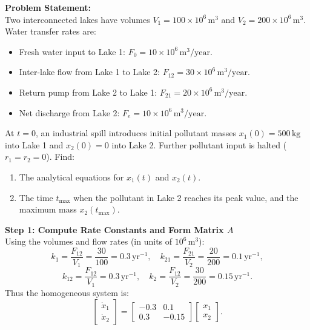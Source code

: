 \documentclass[12pt]{article}
\begin{document}
\begin{examplebox*}
\textbf{Problem Statement:}\\
Two interconnected lakes have volumes $V_1 = 100 \times 10^6\,\text{m}^3$ and $V_2 = 200 \times 10^6\,\text{m}^3$. 
Water transfer rates are:
\begin{itemize}[itemsep=1pt]
  \item Fresh water input to Lake 1: $F_0 = 10 \times 10^6\,\text{m}^3/\text{year}$.
  \item Inter-lake flow from Lake 1 to Lake 2: $F_{12} = 30 \times 10^6\,\text{m}^3/\text{year}$.
  \item Return pump from Lake 2 to Lake 1: $F_{21} = 20 \times 10^6\,\text{m}^3/\text{year}$.
  \item Net discharge from Lake 2: $F_e = 10 \times 10^6\,\text{m}^3/\text{year}$.
\end{itemize}
At $t = 0$, an industrial spill introduces initial pollutant masses $x_1(0) = 500\,\text{kg}$ into Lake 1 and $x_2(0) = 0$ into Lake 2. Further pollutant input is halted ($r_1 = r_2 = 0$).
Find:
\begin{enumerate}[label=(\alph*), itemsep=1pt]
  \item The analytical equations for $x_1(t)$ and $x_2(t)$.
  \item The time $t_{\max}$ when the pollutant in Lake 2 reaches its peak value, and the maximum mass $x_2(t_{\max})$.
\end{enumerate}

\vspace{6pt}
\textbf{Step 1: Compute Rate Constants and Form Matrix $A$}\\
Using the volumes and flow rates (in units of $10^6\,\text{m}^3$):
\[
  k_1 = \frac{F_{12}}{V_1} = \frac{30}{100} = 0.3\,\text{yr}^{-1}, \quad
  k_{21} = \frac{F_{21}}{V_2} = \frac{20}{200} = 0.1\,\text{yr}^{-1},
\]
\[
  k_{12} = \frac{F_{12}}{V_1} = 0.3\,\text{yr}^{-1}, \quad
  k_2 = \frac{F_{12}}{V_2} = \frac{30}{200} = 0.15\,\text{yr}^{-1}.
\]
Thus the homogeneous system is:
\[
  \begin{bmatrix} \dot{x}_1 \\ \dot{x}_2 \end{bmatrix} =
  \begin{bmatrix} -0.3 & 0.1 \\ 0.3 & -0.15 \end{bmatrix}
  \begin{bmatrix} x_1 \\ x_2 \end{bmatrix}.
\]


\end{examplebox*}
\end{document}
